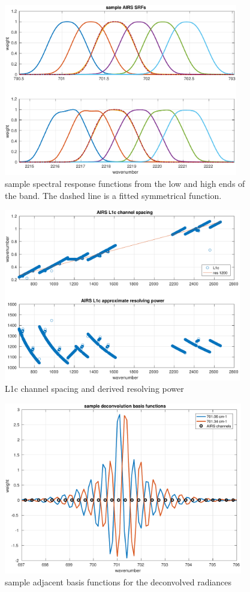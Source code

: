 \documentclass[11pt]{article}
\begin{document}
\begin{figure} %
  \centering
  \includegraphics[height=7.5cm]{figures/airs_sample_srfs.pdf}
  \caption{sample {\airs} spectral response functions from the low
    and high ends of the band.   The dashed line is a fitted
    symmetrical function.}
  \label{srfs1}
\end{figure}

\begin{figure} %
  \centering
  \includegraphics[height=7.5cm]{figures/airs_L1c_res.pdf}
  \caption{{\airs} L1c channel spacing and derived resolving
    power}
  \label{chan1}
\end{figure}

\begin{figure} %
  \centering
  \includegraphics[height=7.5cm]{figures/airs_decon_basis.pdf}
  \caption{sample adjacent basis functions for the deconvolved
    {\airs} radiances}
  \label{dbasis}
\end{figure}
\end{document}
